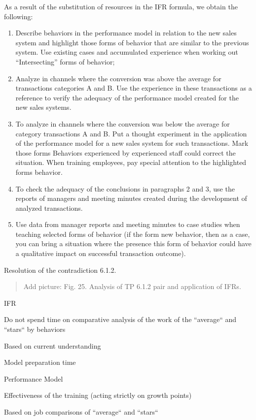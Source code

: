 \documentclass[11pt,a4paper]{book}
\newcommand{\addpicture}[1]{
  \begin{quote} Add picture: #1\end{quote}
}
\begin{document}
As a result of the substitution of resources in the IFR formula, we obtain the
following:
\begin{enumerate}
\item Describe behaviors in the performance model in relation to the new sales
  system and highlight those forms of behavior that are similar to the
  previous system. Use existing cases and accumulated experience when working
  out “Intersecting” forms of behavior;
\item Analyze in channels where the conversion was above the average for
  transactions categories A and B. Use the experience in these transactions as
  a reference to verify the adequacy of the performance model created for the
  new sales systems.
\item To analyze in channels where the conversion was below the average for
  category transactions A and B. Put a thought experiment in the application
  of the performance model for a new sales system for such transactions. Mark
  those forms Behaviors experienced by experienced staff could correct the
  situation.  When training employees, pay special attention to the
  highlighted forms behavior.
\item To check the adequacy of the conclusions in paragraphs 2 and 3, use the
  reports of managers and meeting minutes created during the development of
  analyzed transactions.
\item Use data from manager reports and meeting minutes to case studies when
  teaching selected forms of behavior (if the form new behavior, then as a
  case, you can bring a situation where the presence this form of behavior
  could have a qualitative impact on successful transaction outcome).
\end{enumerate}

Resolution of the contradiction 6.1.2.


\addpicture{Fig. 25. Analysis of TP 6.1.2 pair and application of IFRs.}

IFR

Do not spend time on comparative analysis of the work of the “average“ and
“stars“ by behaviors

Based on current understanding

Model preparation time

Performance Model

Effectiveness of the training (acting strictly on growth points)

Based on job comparisons of “average“ and “stars“
\end{document}
